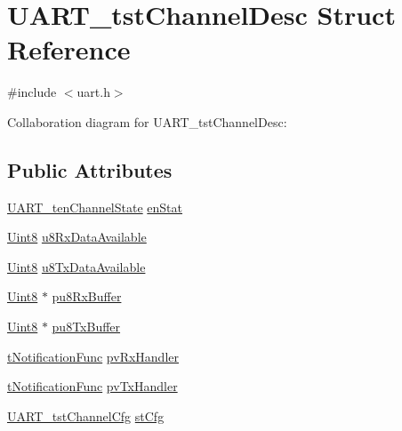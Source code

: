 \hypertarget{struct_u_a_r_t__tst_channel_desc}{}\section{U\+A\+R\+T\+\_\+tst\+Channel\+Desc Struct Reference}
\label{struct_u_a_r_t__tst_channel_desc}


{\ttfamily \#include $<$uart.\+h$>$}



Collaboration diagram for U\+A\+R\+T\+\_\+tst\+Channel\+Desc\+:
\subsection*{Public Attributes}
\begin{DoxyCompactItemize}
\item 
\hyperlink{uart_8h_a3160561225e7b6945530fa0b7d90c46d}{U\+A\+R\+T\+\_\+ten\+Channel\+State} \hyperlink{struct_u_a_r_t__tst_channel_desc_a2742ed6682947c7ca6a2f2f0d27b73aa}{en\+Stat}
\item 
\hyperlink{_d_s_p2833x___device_8h_af84840501dec18061d18a68c162a8fa2}{Uint8} \hyperlink{struct_u_a_r_t__tst_channel_desc_a2a84d2c1824e364b60b24008e4f91ecf}{u8\+Rx\+Data\+Available}
\item 
\hyperlink{_d_s_p2833x___device_8h_af84840501dec18061d18a68c162a8fa2}{Uint8} \hyperlink{struct_u_a_r_t__tst_channel_desc_a2ebf4266655d42a0c591a355912786d9}{u8\+Tx\+Data\+Available}
\item 
\hyperlink{_d_s_p2833x___device_8h_af84840501dec18061d18a68c162a8fa2}{Uint8} $\ast$ \hyperlink{struct_u_a_r_t__tst_channel_desc_aad55b62dfa5687403c235109a18f3354}{pu8\+Rx\+Buffer}
\item 
\hyperlink{_d_s_p2833x___device_8h_af84840501dec18061d18a68c162a8fa2}{Uint8} $\ast$ \hyperlink{struct_u_a_r_t__tst_channel_desc_ac5cdefa52af66cbe3bc5b6e6659d96d0}{pu8\+Tx\+Buffer}
\item 
\hyperlink{uart_8h_acd354ef53b9be6941b51f23ffe59ba0a}{t\+Notification\+Func} \hyperlink{struct_u_a_r_t__tst_channel_desc_acc1d2eaa6b2380c40cb91d24087a5008}{pv\+Rx\+Handler}
\item 
\hyperlink{uart_8h_acd354ef53b9be6941b51f23ffe59ba0a}{t\+Notification\+Func} \hyperlink{struct_u_a_r_t__tst_channel_desc_ab30010b6d09c6b1271e60be3876137b2}{pv\+Tx\+Handler}
\item 
\hyperlink{struct_u_a_r_t__tst_channel_cfg}{U\+A\+R\+T\+\_\+tst\+Channel\+Cfg} \hyperlink{struct_u_a_r_t__tst_channel_desc_a45e955ba130b83a3932d0972bc35e35d}{st\+Cfg}
\end{DoxyCompactItemize}



